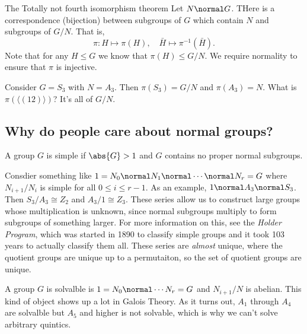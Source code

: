 \begin{theorem}{The Totally not fourth isomorphism theorem}
Let $N \normal G$. THere is a correspondence (bijection) between subgroups of $G$ which contain $N$ and subgroups of $G/N$. That is,
\[ \pi : H \mapsto \pi(H), \quad \bar{H} \mapsto \pi^{-1}(\bar{H}). \]
Note that for any $H \leq G$ we know that $\pi(H) \leq G/N$. We require normality to ensure that $\pi$ is injective.
\end{theorem}

\begin{example}
Consider $G = S_3$ with $N = A_3$. Then $\pi(S_3) = G/N$ and $\pi(A_3) = N$. What is $\pi(\langle (12) \rangle )$? It's all of $G/N$.
\end{example}

\subsection{Why do people care about normal groups?}

\begin{definition}[Simple]
A group $G$  is simple if $\abs{G} > 1$ and $G$ contains no proper normal subgroups.
\end{definition}

\begin{definition}
Consdier something like $1 = N_0 \normal N_1 \normal \cdots \normal N_r = G$ where $N_{i+1}/N_i$ is simple for all $0 \leq i \leq r-1$. As an example, $1 \normal A_3 \normal S_3$. Then $S_3/A_3 \cong Z_2$ and $A_3 / 1 \cong Z_3$. These series allow us to construct large groups whose multiplication is unknown, since normal subgroups multiply to form subgroups of something larger. For more information on this, see the \emph{Holder Program}, which was started in 1890 to classify simple groups and it took 103 years to actually classify them all. These series are \emph{almost} unique, where the quotient groups are unique up to a permutaiton, so the set of quotient groups are unique.
\end{definition}

\begin{definition}
A group $G$ is solvalble is $1 = N_0 \normal \cdots N_r = G$ and $N_{i+1}/N$ is abelian. This kind of object shows up a lot in Galois Theory. As it turns out, $A_1$ through $A_4$ are solvalble but $A_5$ and higher is not solvable, which is why we can't solve arbitrary quintics.
\end{definition}